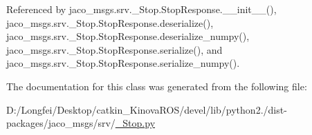 Referenced by jaco\+\_\+msgs.\+srv.\+\_\+\+Stop.\+Stop\+Response.\+\_\+\+\_\+init\+\_\+\+\_\+(), jaco\+\_\+msgs.\+srv.\+\_\+\+Stop.\+Stop\+Response.\+deserialize(), jaco\+\_\+msgs.\+srv.\+\_\+\+Stop.\+Stop\+Response.\+deserialize\+\_\+numpy(), jaco\+\_\+msgs.\+srv.\+\_\+\+Stop.\+Stop\+Response.\+serialize(), and jaco\+\_\+msgs.\+srv.\+\_\+\+Stop.\+Stop\+Response.\+serialize\+\_\+numpy().



The documentation for this class was generated from the following file\+:\begin{DoxyCompactItemize}
\item 
D\+:/\+Longfei/\+Desktop/catkin\+\_\+\+Kinova\+R\+O\+S/devel/lib/python2./dist-\/packages/jaco\+\_\+msgs/srv/\hyperlink{__Stop_8py}{\+\_\+\+Stop.\+py}\end{DoxyCompactItemize}

